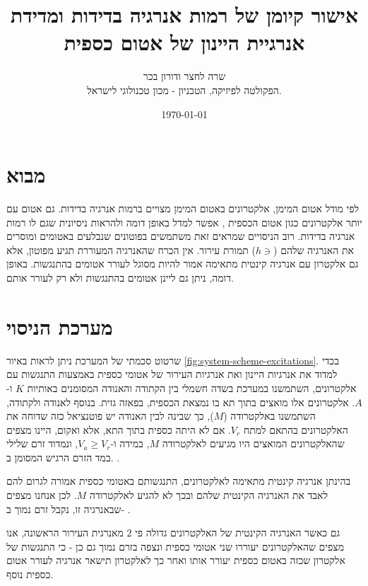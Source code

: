 \documentclass{article}
\title{
אישור קיומן של רמות אנרגיה בדידות ומדידת אנרגיית היינון של אטום כספית
}
\author{
שרה לחצר ודורון בכר \\
הפקולטה לפיזיקה, הטכניון - מכון טכנולוגי לישראל.
}
\date{\today}
\newcommand*\circled[1]{\tikz[baseline=(char.base)]{
		            \node[shape=circle,draw,inner sep=1pt] (char) {#1};}}
\begin{document}
\maketitle

\begin{abstract}
\end{abstract}

\section{מבוא}

לפי מודל אטום המימן, אלקטרונים באטום המימן מצויים ברמות אנרגיה בדידות. גם אטום
עם יותר אלקטרונים כגון אטום הכספית , אפשר למדל באופן דומה ולהראות
ניסיונית שגם לו רמות אנרגיה בדידות. רוב הניסויים שמראים זאת משתמשים בפוטונים
שנבלעים באטומים ומוסרים את האנרגיה שלהם ($h \ni$) תמורת עירור. אין הכרח
שהאנרגיה המעוררת תגיע מפוטון, אלא גם אלקטרון עם אנרגיה קינטית מתאימה אמור להיות
מסוגל לעורר אטומים בהתנגשות. באופן דומה, ניתן גם ליינן אטומים בהתנגשות ולא רק
לעורר אותם.


\section{מערכת הניסוי}

שרטוט סכמתי של המערכת ניתן לראות באיור \ref{fig:system-scheme-excitations}.
בכדי למדוד את אנרגיות היינון ואת אנרגיות העירור של אטומי כספית באמצעות התנגשות
עם אלקטרונים, השתמשנו במערכת בשדה חשמלי בין הקתודה והאנודה המסומנים באותיות $K$
ו-$A$. אלקטרונים אלו מואצים בתוך תא בו נמצאת הכספית, בפאזה גזית. בנוסף לאנודה
ולקתודה, השתמשנו באלקטרודה ($M$), כך שבינה לבין האנודה יש פוטנציאל כזה שדוחה את
האלקטרונים בהתאם למתח $V_r$. אם לא היתה כספית בתוך התא, אלא ואקום, היינו מצפים
שהאלקטרונים המואצים היו מגיעים לאלקטרודה $M$, במידה ו-$V_a \ge  V_r$, ונמדוד
זרם שלילי במד הזרם הרגיש המסומן ב.
\circled{pA}.

בהינתן אנרגיה קינטית מתאימה לאלקטרונים, התנגשותם באטומי כספית אמורה לגרום להם
לאבד את האנרגיה הקינטית שלהם ובכך לא להגיע לאלקטרודה $M$. לכן אנחנו מצפים
שבאנרגיה זו, נקבל זרם נמוך ב-
\circled{pA}.

גם כאשר האנרגיה הקינטית של האלקטרונים גדולה פי
$2$
מאנרגית העירור הראשונה, אנו מצפים שהאלקטרונים יעוררו שני אטומי כספית ונצפה בזרם נמוך גם כן - כי התנגשות של אלקטרון שכזה באטום כספית יעורר אותו ואחר כך לאלקטרון תישאר אנרגיה לעורר אטום כספית נוסף.
\end{document}
